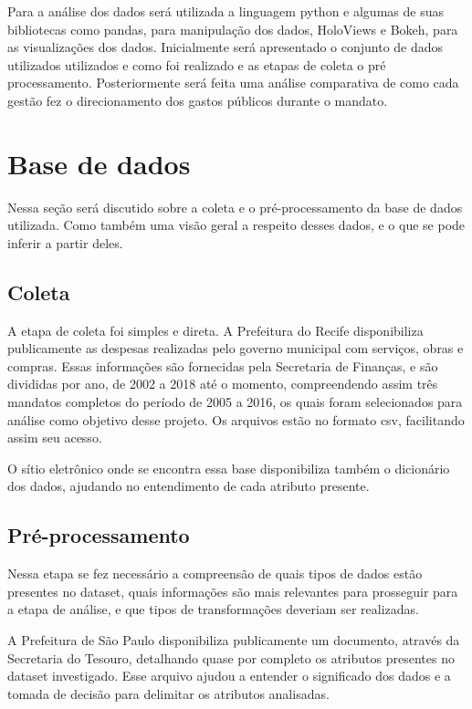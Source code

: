 \documentclass[authoryear]{elsarticle}
\begin{document}
Para a análise dos dados será utilizada a linguagem python e algumas de suas bibliotecas como pandas, para manipulação dos dados, HoloViews e Bokeh, para as visualizações dos dados. 
Inicialmente será apresentado o conjunto de dados utilizados utilizados e como foi realizado e as etapas de coleta o pré processamento. Posteriormente será feita uma análise comparativa de como cada gestão fez o direcionamento dos gastos públicos durante o mandato.

\section{Base de dados}
Nessa seção será discutido sobre a coleta e o pré-processamento da base de dados utilizada. Como também uma visão geral a respeito desses dados, e o que se pode inferir a partir deles.

\subsection{Coleta}

A etapa de coleta foi simples e direta. A Prefeitura do Recife disponibiliza publicamente as despesas realizadas pelo governo municipal com serviços, obras e compras. Essas informações são fornecidas pela Secretaria de Finanças, e são divididas por ano, de 2002 a 2018 até o momento, compreendendo assim três mandatos completos do período de 2005 a 2016, os quais foram selecionados para análise como objetivo desse projeto. Os arquivos estão no formato csv, facilitando assim seu acesso.

O sítio eletrônico onde se encontra essa base disponibiliza também o dicionário dos dados\citep{descricao2018}, ajudando no entendimento de cada atributo presente. 

\subsection{Pré-processamento}

Nessa etapa se fez necessário a compreensão de quais tipos de dados estão presentes no dataset, quais informações são mais relevantes para prosseguir para a etapa de análise, e que tipos de transformações deveriam ser realizadas.

A Prefeitura de São Paulo disponibiliza publicamente um documento, através da Secretaria do Tesouro, detalhando quase por completo os atributos presentes no dataset investigado\citep{transparenciasp2018}. Esse arquivo ajudou a entender o significado dos dados e a tomada de decisão para delimitar os atributos analisadas.
\end{document}
